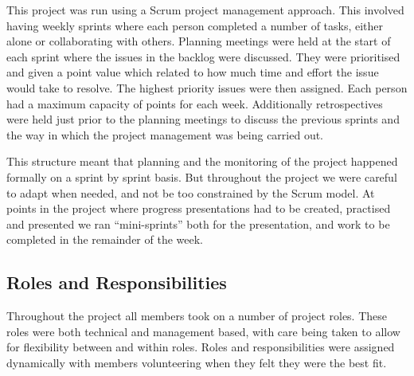 This project was run using a Scrum project management approach. This involved having weekly sprints where each person completed a number of tasks, either alone or collaborating with others. Planning meetings were held at the start of each sprint where the issues in the backlog were discussed. They were prioritised and given a point value which related to how much time and effort the issue would take to resolve. The highest priority issues were then assigned. Each person had a maximum capacity of points for each week. Additionally retrospectives were held just prior to the planning meetings to discuss the previous sprints and the way in which the project management was being carried out.

This structure meant that planning and the monitoring of the project happened formally on a sprint by sprint basis. But throughout the project we were careful to adapt when needed, and not be too constrained by the Scrum model. At points in the project where progress presentations had to be created, practised and presented we ran ``mini-sprints'' both for the presentation, and work to be completed in the remainder of the week.

\subsection{Roles and Responsibilities}

Throughout the project all members took on a number of project roles. These roles were both technical and management based, with care being taken to allow for flexibility between and within roles. Roles and responsibilities were assigned dynamically with members volunteering when they felt they were the best fit.

